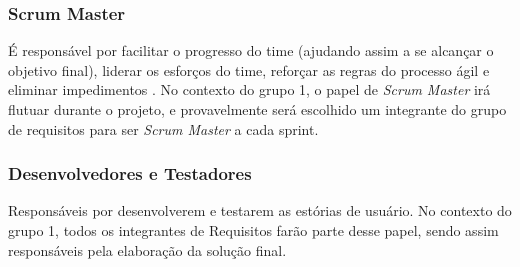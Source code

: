 \subsubsection{Scrum Master}
É responsável por facilitar o progresso do time (ajudando assim a se alcançar o objetivo final), liderar os esforços do time, reforçar as regras do processo ágil e eliminar impedimentos \cite{safe001}. No contexto do grupo 1, o papel de \emph{Scrum Master} irá flutuar durante o projeto, e provavelmente será escolhido um integrante do grupo de requisitos para ser \emph{Scrum Master} a cada sprint.

\subsubsection{Desenvolvedores e Testadores}
Responsáveis por desenvolverem e testarem as estórias de usuário. No contexto do grupo 1, todos os integrantes de Requisitos farão parte desse papel, sendo assim responsáveis pela elaboração da solução final.